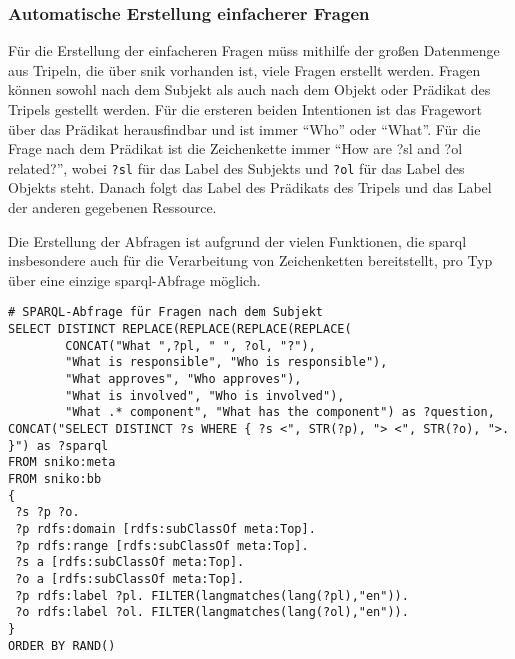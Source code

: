 \subsubsection{Automatische Erstellung einfacherer Fragen}
Für die Erstellung der einfacheren Fragen müss mithilfe der großen Datenmenge aus Tripeln, die über \ac{snik} vorhanden ist, viele Fragen erstellt werden.
Fragen können sowohl nach dem Subjekt als auch nach dem Objekt oder Prädikat des Tripels gestellt werden.
Für die ersteren beiden Intentionen ist das Fragewort über das Prädikat herausfindbar und ist immer \enquote{Who} oder \enquote{What}.
Für die Frage nach dem Prädikat ist die Zeichenkette immer \enquote{How are ?sl and ?ol related?}, wobei \texttt{?sl} für das Label des Subjekts und \texttt{?ol} für das Label des Objekts steht.
Danach folgt das Label des Prädikats des Tripels und das Label der anderen gegebenen Ressource.

Die Erstellung der Abfragen ist aufgrund der vielen Funktionen, die \ac{sparql} insbesondere auch für die Verarbeitung von Zeichenketten bereitstellt, pro Typ über eine einzige \ac{sparql}-Abfrage möglich.
\begin{lstlisting}[language=SPARQL]
# SPARQL-Abfrage für Fragen nach dem Subjekt
SELECT DISTINCT REPLACE(REPLACE(REPLACE(REPLACE(
        CONCAT("What ",?pl, " ", ?ol, "?"),
        "What is responsible", "Who is responsible"),
        "What approves", "Who approves"),
        "What is involved", "Who is involved"),
        "What .* component", "What has the component") as ?question,
CONCAT("SELECT DISTINCT ?s WHERE { ?s <", STR(?p), "> <", STR(?o), ">. }") as ?sparql
FROM sniko:meta
FROM sniko:bb
{
 ?s ?p ?o.
 ?p rdfs:domain [rdfs:subClassOf meta:Top].
 ?p rdfs:range [rdfs:subClassOf meta:Top].
 ?s a [rdfs:subClassOf meta:Top].
 ?o a [rdfs:subClassOf meta:Top].
 ?p rdfs:label ?pl. FILTER(langmatches(lang(?pl),"en")).
 ?o rdfs:label ?ol. FILTER(langmatches(lang(?ol),"en")).
}
ORDER BY RAND()
\end{lstlisting}

